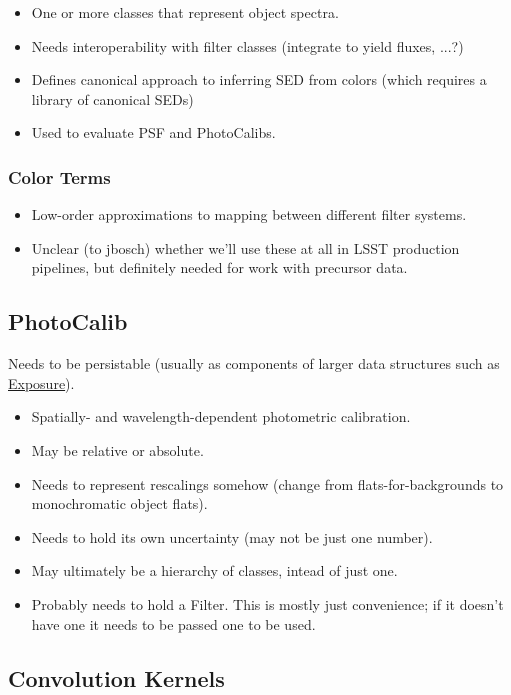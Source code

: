 \begin{itemize}
\item One or more classes that represent object spectra.
\item Needs interoperability with filter classes (integrate to yield fluxes, ...?)
\item Defines canonical approach to inferring SED from colors (which requires a library of canonical SEDs)
\item Used to evaluate PSF and PhotoCalibs.
\end{itemize}

\subsubsection{Color Terms}
\label{sec:spColorTerms}

\begin{itemize}
\item Low-order approximations to mapping between different filter systems.
\item Unclear (to jbosch) whether we'll use these at all in LSST production pipelines, but definitely needed for work with precursor data.
\end{itemize}

\subsection{PhotoCalib}
\label{sec:spPhotoCalib}

Needs to be persistable (usually as components of larger data structures such as \hyperref[sec:spImagesExposure]{Exposure}).

\begin{itemize}
\item Spatially- and wavelength-dependent photometric calibration.
\item May be relative or absolute.
\item Needs to represent rescalings somehow (change from flats-for-backgrounds to monochromatic object flats).
\item Needs to hold its own uncertainty (may not be just one number).
\item May ultimately be a hierarchy of classes, intead of just one.
\item Probably needs to hold a Filter.  This is mostly just convenience; if it doesn't have one it needs to be passed one to be used.
\end{itemize}


\subsection{Convolution Kernels}
\label{sec:spKernels}

